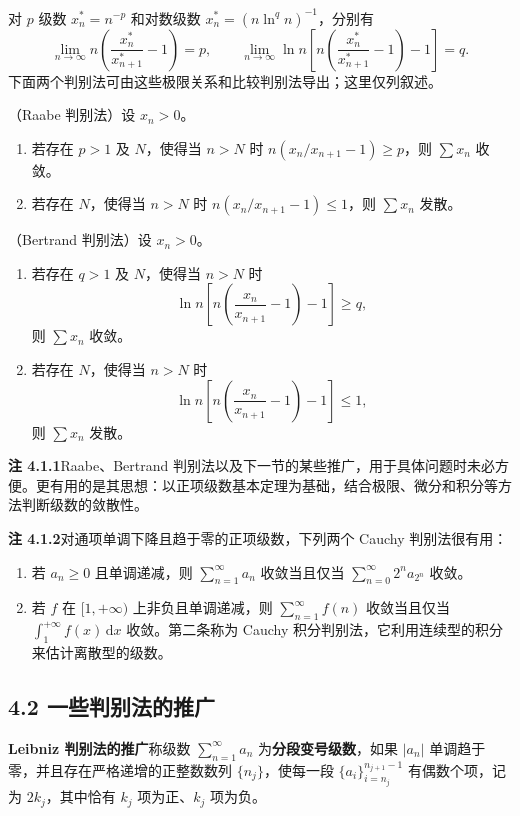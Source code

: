 对 $p$ 级数 $x_n^*=n^{-p}$ 和对数级数 $x_n^*=(n\ln^q n)^{-1}$，分别有
\[
\lim_{n\to\infty}n\left(\frac{x_n^*}{x_{n+1}^*}-1\right)=p,
\qquad
\lim_{n\to\infty}\ln n\left[n\left(\frac{x_n^*}{x_{n+1}^*}-1\right)-1\right]=q.
\]
下面两个判别法可由这些极限关系和比较判别法导出；这里仅列叙述。

（Raabe 判别法）设 $x_n>0$。
\begin{enumerate}[label=（\arabic*）,leftmargin=3em]
\item 若存在 $p>1$ 及 $N$，使得当 $n>N$ 时 $n(x_n/x_{n+1}-1)\geq p$，则 $\sum x_n$ 收敛。
\item 若存在 $N$，使得当 $n>N$ 时 $n(x_n/x_{n+1}-1)\leq1$，则 $\sum x_n$ 发散。
\end{enumerate}

（Bertrand 判别法）设 $x_n>0$。
\begin{enumerate}[label=（\arabic*）,leftmargin=3em]
\item 若存在 $q>1$ 及 $N$，使得当 $n>N$ 时
\[
\ln n\left[n\left(\frac{x_n}{x_{n+1}}-1\right)-1\right]\geq q,
\]
则 $\sum x_n$ 收敛。
\item 若存在 $N$，使得当 $n>N$ 时
\[
\ln n\left[n\left(\frac{x_n}{x_{n+1}}-1\right)-1\right]\leq1,
\]
则 $\sum x_n$ 发散。
\end{enumerate}

\noindent\textbf{注 4.1.1}\quad Raabe、Bertrand 判别法以及下一节的某些推广，用于具体问题时未必方便。更有用的是其思想：以正项级数基本定理为基础，结合极限、微分和积分等方法判断级数的敛散性。

\noindent\textbf{注 4.1.2}\quad 对通项单调下降且趋于零的正项级数，下列两个 Cauchy 判别法很有用：
\begin{enumerate}[label=（\arabic*）,leftmargin=3em]
\item 若 $a_n\geq0$ 且单调递减，则 $\sum_{n=1}^{\infty}a_n$ 收敛当且仅当 $\sum_{n=0}^{\infty}2^na_{2^n}$ 收敛。
\item 若 $f$ 在 $[1,+\infty)$ 上非负且单调递减，则 $\sum_{n=1}^{\infty}f(n)$ 收敛当且仅当 $\int_1^{+\infty}f(x)\,\mathrm dx$ 收敛。第二条称为 Cauchy 积分判别法，它利用连续型的积分来估计离散型的级数。
\end{enumerate}

\subsection*{4.2 一些判别法的推广}

\noindent\textbf{Leibniz 判别法的推广}\quad 称级数 $\sum_{n=1}^{\infty}a_n$ 为\textbf{分段变号级数}，如果 $|a_n|$ 单调趋于零，并且存在严格递增的正整数数列 $\{n_j\}$，使每一段 $\{a_i\}_{i=n_j}^{n_{j+1}-1}$ 有偶数个项，记为 $2k_j$，其中恰有 $k_j$ 项为正、$k_j$ 项为负。


